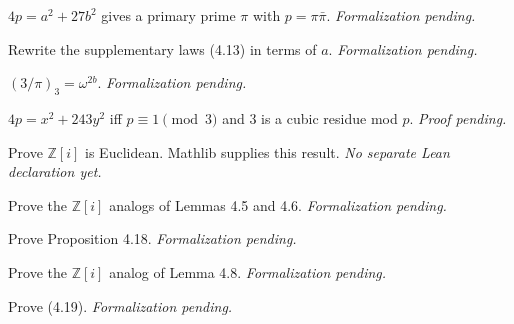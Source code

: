 \begin{theorem}[Exercise 4.15(a)]
  \label{exr:s4_15_a}
  \notready
  $4p = a^2 + 27b^2$ gives a primary prime $\pi$ with $p = \pi\bar\pi$.
  \emph{Formalization pending.}
\end{theorem}

\begin{theorem}[Exercise 4.15(b)]
  \label{exr:s4_15_b}
  \notready
  Rewrite the supplementary laws (4.13) in terms of $a$. \emph{Formalization pending.}
\end{theorem}

\begin{theorem}[Exercise 4.15(c)]
  \label{exr:s4_15_c}
  \notready
  $(3/\pi)_3 = \omega^{2b}$. \emph{Formalization pending.}
\end{theorem}

\begin{theorem}[Exercise 4.15(d)]
  \label{exr:s4_15_d}
  \leanok
  \notready
  $4p = x^2 + 243y^2$ iff $p \equiv 1 \pmod 3$ and $3$ is a cubic residue mod $p$.
  \emph{Proof pending.}
\end{theorem}

\begin{theorem}[Exercise 4.16(a)]
  \label{exr:s4_16_a}
  \notready
  Prove $\mathbb Z[i]$ is Euclidean. Mathlib supplies this result.
  \emph{No separate Lean declaration yet.}
\end{theorem}

\begin{theorem}[Exercise 4.16(b)]
  \label{exr:s4_16_b}
  \notready
  Prove the $\mathbb Z[i]$ analogs of Lemmas 4.5 and 4.6. \emph{Formalization pending.}
\end{theorem}

\begin{theorem}[Exercise 4.16(c)]
  \label{exr:s4_16_c}
  \notready
  Prove Proposition 4.18. \emph{Formalization pending.}
\end{theorem}

\begin{theorem}[Exercise 4.16(d)]
  \label{exr:s4_16_d}
  \notready
  Prove the $\mathbb Z[i]$ analog of Lemma 4.8. \emph{Formalization pending.}
\end{theorem}

\begin{theorem}[Exercise 4.16(e)]
  \label{exr:s4_16_e}
  \notready
  Prove (4.19). \emph{Formalization pending.}
\end{theorem}

